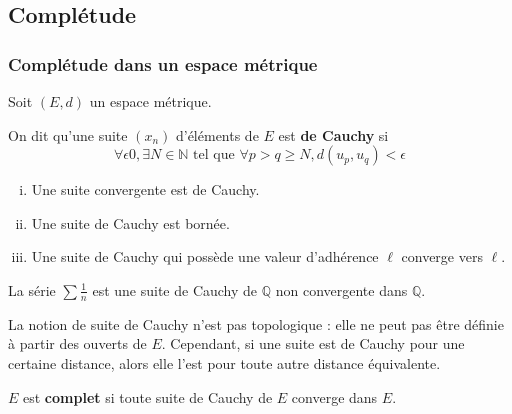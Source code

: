 



	
	\subsection{Complétude}
	
	\subsubsection{Complétude dans un espace métrique}
	
	
	Soit $(E,d)$ un espace métrique.
	
	\begin{definition}
		On dit qu'une suite $(x_n)$ d'éléments de $E$ est \textbf{de Cauchy} si
		\[ \forall \epsilon 0, \exists N \in \mathbb{N} \text{ tel que } \forall p > q \geq N, d(u_p, u_q) < \epsilon \]
	\end{definition}
	
	\begin{proposition}
		\begin{enumerate}[(i)]
			\item Une suite convergente est de Cauchy.
			\item Une suite de Cauchy est bornée.
			\item Une suite de Cauchy qui possède une valeur d'adhérence $\ell$ converge vers $\ell$.
		\end{enumerate}
	\end{proposition}
	
	
	\begin{cexample}
		La série $\sum \frac{1}{n}$ est une suite de Cauchy de $\mathbb{Q}$ non convergente dans $\mathbb{Q}$.
	\end{cexample}
	
	
	\begin{remark}
		La notion de suite de Cauchy n'est pas topologique : elle ne peut pas être définie à partir des ouverts de $E$. Cependant, si une suite est de Cauchy pour une certaine distance, alors elle l'est pour toute autre distance équivalente.
	\end{remark}
	
	\begin{definition}
		$E$ est \textbf{complet} si toute suite de Cauchy de $E$ converge dans $E$.
	\end{definition}
	
